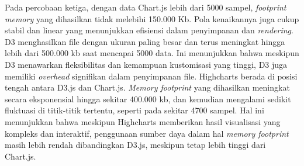 Pada percobaan ketiga, dengan data Chart.js lebih dari 5000 sampel, \textit{footprint memory} yang dihasilkan tidak melebihi 150.000 Kb. Pola kenaikannya juga cukup stabil dan linear yang menunjukkan efisiensi dalam penyimpanan dan \textit{rendering}. D3 menghasilkan file dengan ukuran paling besar dan terus meningkat hingga lebih dari 500.000 kb saat mencapai 5000 data. Ini menunjukkan bahwa meskipun D3 menawarkan fleksibilitas dan kemampuan kustomisasi yang tinggi, D3 juga memiliki \textit{overhead} signifikan dalam penyimpanan file. Highcharts berada di posisi tengah antara D3.js dan Chart.js. \textit{Memory footprint} yang dihasilkan meningkat secara eksponensial hingga sekitar 400.000 kb, dan kemudian mengalami sedikit fluktuasi di titik-titik tertentu, seperti pada sekitar 4700 sampel. Hal ini menunjukkan bahwa meskipun Highcharts memberikan hasil visualisasi yang kompleks dan interaktif, penggunaan sumber daya dalam hal \textit{memory footprint} masih lebih rendah dibandingkan D3.js, meskipun tetap lebih tinggi dari Chart.js.

